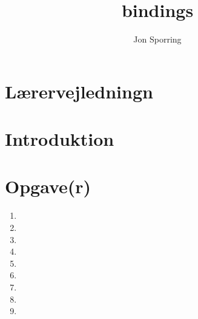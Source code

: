 \documentclass[a4paper,12pt]{article}
\title{bindings}
\author{Jon Sporring}
\begin{document}
\maketitle

\section{Lærervejledningn}

\section{Introduktion}

\section{Opgave(r)}
\begin{enumerate}
\item 
\item 
\item 
\item 
\item 
\item 
\item 
\item 
\item 
\end{enumerate}
\end{document}
